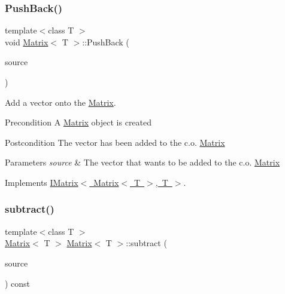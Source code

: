 \subsubsection{\texorpdfstring{PushBack()}{PushBack()}}
{\footnotesize\ttfamily template$<$class T $>$ \\
void \mbox{\hyperlink{class_matrix}{Matrix}}$<$ T $>$\+::Push\+Back (\begin{DoxyParamCaption}\item[{const \mbox{\hyperlink{class_my_vector}{My\+Vector}}$<$ T $>$ \&}]{source }\end{DoxyParamCaption})\hspace{0.3cm}{\ttfamily [virtual]}}



Add a vector onto the \mbox{\hyperlink{class_matrix}{Matrix}}. 

\begin{DoxyPrecond}{Precondition}
A \mbox{\hyperlink{class_matrix}{Matrix}} object is created 
\end{DoxyPrecond}
\begin{DoxyPostcond}{Postcondition}
The vector has been added to the c.\+o. \mbox{\hyperlink{class_matrix}{Matrix}}
\end{DoxyPostcond}

\begin{DoxyParams}{Parameters}
{\em source} & The vector that wants to be added to the c.\+o. \mbox{\hyperlink{class_matrix}{Matrix}} \\
\hline
\end{DoxyParams}


Implements \mbox{\hyperlink{class_i_matrix_aa5de147c7aa5b74b0f2177ed1a8158de}{I\+Matrix$<$ Matrix$<$ T $>$, T $>$}}.

\mbox{\label{class_matrix_a468aedc8546d97964f692a30f1e24f94}} 
\subsubsection{\texorpdfstring{subtract()}{subtract()}\hspace{0.1cm}{\footnotesize\ttfamily [1/6]}}
{\footnotesize\ttfamily template$<$class T $>$ \\
\mbox{\hyperlink{class_matrix}{Matrix}}$<$ T $>$ \mbox{\hyperlink{class_matrix}{Matrix}}$<$ T $>$\+::subtract (\begin{DoxyParamCaption}\item[{const \mbox{\hyperlink{class_i_matrix}{I\+Matrix}}$<$ \mbox{\hyperlink{class_matrix}{Matrix}}$<$ T $>$, T $>$ \&}]{source }\end{DoxyParamCaption}) const\hspace{0.3cm}{\ttfamily [virtual]}}



